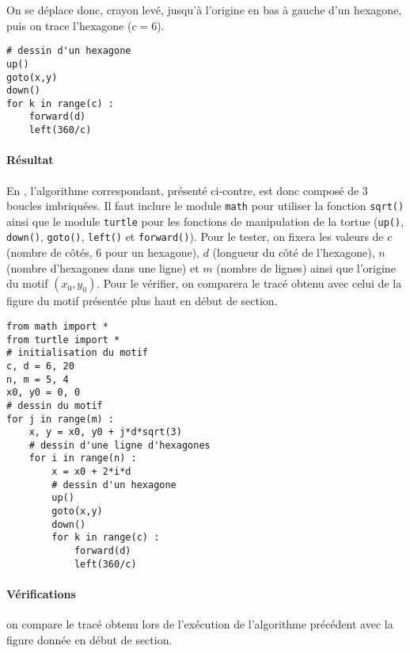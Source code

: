 \begin{enumerate}
On se déplace donc, crayon levé, jusqu'à l'origine en bas à gauche d'un hexagone,
puis on trace l'hexagone ($c = 6$).
\begin{Verbatim}	
# dessin d'un hexagone
up()
goto(x,y)
down()
for k in range(c) :
    forward(d)
    left(360/c)
\end{Verbatim}

\end{enumerate}

\noindent
\begin{minipage}[t]{7cm}
\paragraph{Résultat} En \python, l'algorithme correspondant, présenté ci-contre, 
est donc composé de 3 boucles imbriquées. 
Il faut inclure le module \texttt{math} pour utiliser la fonction \texttt{sqrt()}
ainsi que le module \texttt{turtle} pour les fonctions de manipulation de la tortue \logo{}
(\texttt{up()}, \texttt{down()}, \texttt{goto()}, \texttt{left()} et \texttt{forward()}).
Pour le tester, on fixera les valeurs de $c$ (nombre de côtés, 6 pour un hexagone),
$d$ (longueur du côté de l'hexagone), $n$ (nombre d'hexagones dans une ligne) et $m$ 
(nombre de lignes) ainsi que l'origine du motif  $(x_0,y_0)$.
Pour le vérifier, on comparera le tracé obtenu avec celui de la figure du motif
présentée plus haut en début de section.
\end{minipage}
\hfill
\begin{minipage}[t]{8.25cm}\footnotesize
\begin{lstlisting}
from math import *
from turtle import *
# initialisation du motif
c, d = 6, 20
n, m = 5, 4
x0, y0 = 0, 0
# dessin du motif
for j in range(m) :
    x, y = x0, y0 + j*d*sqrt(3)
    # dessin d'une ligne d'hexagones
    for i in range(n) :
        x = x0 + 2*i*d
        # dessin d'un hexagone
        up()
        goto(x,y)
        down()
        for k in range(c) :
            forward(d)
            left(360/c)
\end{lstlisting}
\end{minipage}

\paragraph{Vérifications} 
on compare le tracé obtenu lors de l'exécution de l'algorithme précédent avec la figure donnée
en début de section.
\vspace*{3mm}

